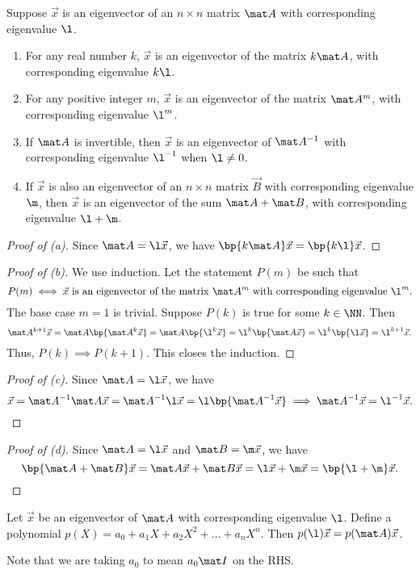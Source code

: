 \begin{proposition}
    Suppose $\vec x$ is an eigenvector of an $n \times n$ matrix $\mat A$ with corresponding eigenvalue $\l$.
    \begin{enumerate}
        \item For any real number $k$, $\vec x$ is an eigenvector of the matrix $k \mat A$, with corresponding eigenvalue $k \l$.
        \item For any positive integer $m$, $\vec x$ is an eigenvector of the matrix $\mat A^m$, with corresponding eigenvalue $\l^m$.
        \item If $\mat A$ is invertible, then $\vec x$ is an eigenvector of $\mat A^{-1}$ with corresponding eigenvalue $\l^{-1}$ when $\l \neq 0$.
        \item If $\vec x$ is also an eigenvector of an $n \times n$ matrix $\vec B$ with corresponding eigenvalue $\m$, then $\vec x$ is an eigenvector of the sum $\mat A + \mat B$, with corresponding eigenvalue $\l + \m$.
    \end{enumerate}
\end{proposition}
\begin{proof}[Proof of \emph{(a)}]
    Since $\mat A = \l \vec x$, we have $\bp{k \mat A} \vec x = \bp{k \l} \vec x$.
\end{proof}
\begin{proof}[Proof of \emph{(b)}]
    We use induction. Let the statement $P(m)$ be such that \[P(m) \iff \text{$\vec x$ is an eigenvector of the matrix $\mat A^m$ with corresponding eigenvalue $\l^m$}.\] The base case $m = 1$ is trivial. Suppose $P(k)$ is true for some $k \in \NN$. Then \[\mat A^{k+1} \vec x = \mat A \bp{\mat A^k \vec x} = \mat A \bp{\l^k \vec x} = \l^k \bp{\mat A \vec x} = \l^k \bp{\l \vec x} = \l^{k+1} \vec x.\] Thus, $P(k) \implies P(k+1)$. This closes the induction.
\end{proof}
\begin{proof}[Proof of \emph{(c)}]
    Since $\mat A = \l \vec x$, we have \[\vec x = \mat A^{-1} \mat A \vec x = \mat A^{-1} \l \vec x = \l \bp{\mat A^{-1} \vec x} \implies \mat A^{-1} \vec x = \l^{-1} \vec x.\]
\end{proof}
\begin{proof}[Proof of \emph{(d)}]
    Since $\mat A = \l \vec x$ and $\mat B = \m \vec x$, we have \[\bp{\mat A + \mat B} \vec x = \mat A \vec x + \mat B \vec x = \l \vec x + \m \vec x = \bp{\l + \m} \vec x.\]
\end{proof}

\begin{corollary}
    Let $\vec x$ be an eigenvector of $\mat A$ with corresponding eigenvalue $\l$. Define a polynomial $p(X) = a_0 + a_1 X + a_2 X^2 + \dots + a_n X^n$. Then $p(\l) \vec x = p(\mat A) \vec x$.
\end{corollary}
Note that we are taking $a_0$ to mean $a_0 \mat I$ on the RHS.

